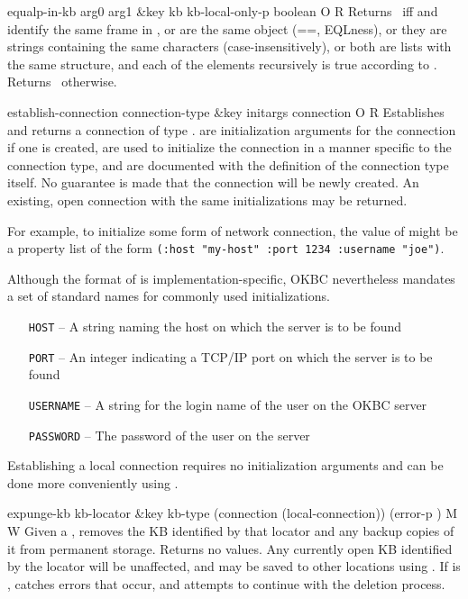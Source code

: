 \begin{okbcop}{equalp-in-kb}{ arg0 arg1 \&key kb kb-local-only-p} { boolean } { O } { R } {  }
Returns \true\ iff  and 
   identify the same frame in , or are the same object (==, EQLness),
   or they are strings containing the same characters (case-insensitively), or
   both are lists with the same structure, and each of the elements
   recursively is true according to .  Returns
   \false\ otherwise.
\end{okbcop}

\begin{okbcop}{establish-connection}{ connection-type \&key initargs} { connection } { O } { R } {  }
Establishes and returns a connection of type .
    are initialization arguments for the connection if one
   is created, are used to initialize the connection in a manner
   specific to the connection type, and are documented with the definition
   of the connection type itself.  No guarantee is made that the connection
   will be newly created.  An existing, open connection with the same
   initializations may be returned.

   For example, to initialize some form of network connection, the value of
    might be a property list of the form
   \verb|(:host "my-host" :port 1234 :username "joe")|.

   Although the format of  is implementation-specific, OKBC
   nevertheless mandates a set of standard names for commonly used
   initializations.
   \begin{itemize}
   \item [{\tt HOST}] -- A string naming the host on which the server is
                          to be found
   \item [{\tt PORT}] -- An integer indicating a TCP/IP port on which the
                          server is to be found
   \item [{\tt USERNAME}] -- A string for the login name of the user on
                              the OKBC server
   \item [{\tt PASSWORD}] -- The password of the user on the server
   \end{itemize}

   Establishing a local connection requires no initialization arguments and
   can be done more conveniently using .
\end{okbcop}

\begin{okbcop}{expunge-kb}{ kb-locator \&key kb-type (connection (local-connection)) (error-p \true)} { \void } { M } { W } {  }
Given a , removes the KB identified by that locator
   and any backup copies of it from permanent storage.  Returns no values.
   Any currently open KB identified by the locator will be unaffected,
   and may be saved to other locations using .  If
    is \false,  catches errors that
   occur, and attempts to continue with the deletion process.
\end{okbcop}

